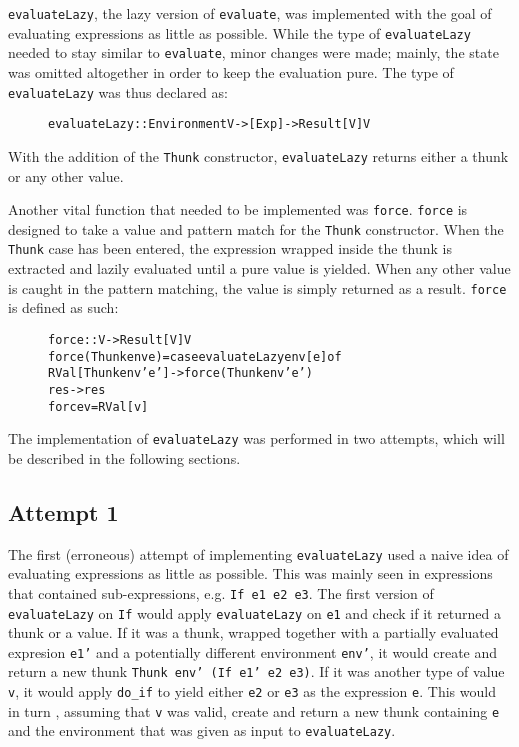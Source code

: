 \texttt{evaluateLazy}, the lazy version of \texttt{evaluate}, was implemented
with the goal of evaluating expressions as little as possible. While the type
of \texttt{evaluateLazy} needed to stay similar to
\texttt{evaluate}, minor changes were made; mainly, the state was omitted
altogether in order to keep the evaluation pure. The type of
\texttt{evaluateLazy} was thus declared as:

\begin{figure}[H]
\begin{alltt}
  evaluateLazy :: Environment V -> [Exp] -> Result [V] V
\end{alltt}
\end{figure}

With the addition of the \texttt{Thunk} constructor, \texttt{evaluateLazy}
returns either a thunk or any other value.

Another vital function that needed to be implemented was \texttt{force}.
\texttt{force} is designed to take a value and pattern match for the
\texttt{Thunk} constructor. When the \texttt{Thunk} case has been entered,
the expression wrapped inside the thunk is extracted and lazily evaluated until
a pure value is yielded. When any other value is caught in the pattern matching,
the value is simply returned as a result. \texttt{force} is defined as such:

\begin{figure}[H]
\begin{alltt}
  force :: V -> Result [V] V
  force (Thunk env e) = case evaluateLazy env [e] of
    RVal [Thunk env' e'] -> force (Thunk env' e')
    res -> res
  force v = RVal [v]
\end{alltt}
\end{figure}

The implementation of \texttt{evaluateLazy} was performed in two attempts, which
will be described in the following sections.

\subsection{Attempt 1}
The first (erroneous) attempt of implementing \texttt{evaluateLazy} used a naive
idea of evaluating expressions as little as possible. This was mainly seen in
expressions that contained sub-expressions, e.g. \texttt{If e1 e2 e3}. The first
version of \texttt{evaluateLazy} on \texttt{If} would apply
\texttt{evaluateLazy} on \texttt{e1} and check if it returned a thunk or a
value. If it was a thunk, wrapped together with a partially evaluated expresion
\texttt{e1'} and a potentially different environment \texttt{env'}, it would
create and return a new thunk \texttt{Thunk env' (If e1' e2 e3)}. If it was
another type of value \texttt{v}, it would apply \texttt{do\_if} to yield either
\texttt{e2} or \texttt{e3} as the expression \texttt{e}. This would in turn
, assuming that \texttt{v} was valid, create and return a new thunk containing
\texttt{e} and the environment that was given as input to \texttt{evaluateLazy}.

